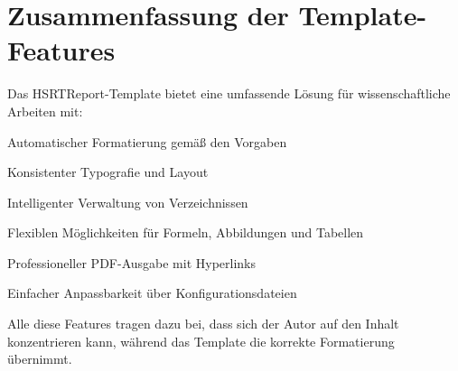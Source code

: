 \section{Zusammenfassung der Template-Features}
\label{sec:template_zusammenfassung}

Das HSRTReport-Template bietet eine umfassende Lösung für wissenschaftliche Arbeiten mit:
\begin{listenabsatz}
	\item Automatischer Formatierung gemäß den Vorgaben
	\item Konsistenter Typografie und Layout
	\item Intelligenter Verwaltung von Verzeichnissen
	\item Flexiblen Möglichkeiten für Formeln, Abbildungen und Tabellen
	\item Professioneller PDF-Ausgabe mit Hyperlinks
	\item Einfacher Anpassbarkeit über Konfigurationsdateien
\end{listenabsatz}

Alle diese Features tragen dazu bei, dass sich der Autor auf den Inhalt konzentrieren kann, während das Template die korrekte Formatierung übernimmt.

